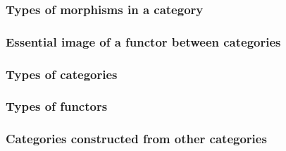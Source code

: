 








\subsubsection{Types of morphisms in a category}





\subsubsection{Essential image of a functor between categories}





\subsubsection{Types of categories}



\subsubsection{Types of functors}




% 





\subsubsection{Categories constructed from other categories}

